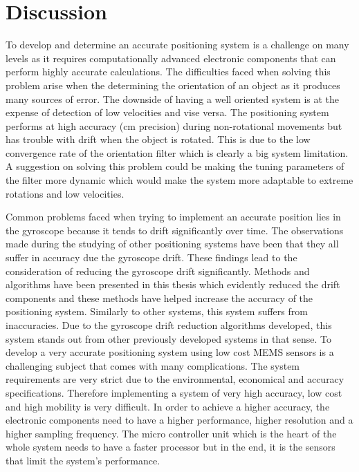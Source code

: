 \section{Discussion}
To develop and determine an accurate positioning system is a challenge on many levels as it requires computationally advanced electronic components that can perform highly accurate calculations. The difficulties faced when solving this problem arise when the determining the orientation of an object as it produces many sources of error. The downside of having a well oriented system is at the expense of detection of low velocities and vise versa. The positioning system performs at high accuracy (cm precision) during non-rotational movements but has trouble with drift when the object is rotated. This is due to the low convergence rate of the orientation filter which is clearly a big system limitation. A suggestion on solving this problem could be making the tuning parameters of the filter more dynamic which would make the system more adaptable to extreme rotations and low velocities.

Common problems faced when trying to implement an accurate position lies in the gyroscope because it tends to drift significantly over time. The observations made during the studying of other positioning systems have been that they all suffer in accuracy due the gyroscope drift. These findings lead to the consideration of reducing the gyroscope drift significantly. Methods and algorithms have been presented in this thesis which evidently reduced the drift components and these methods have helped increase the accuracy of the positioning system. Similarly to other systems, this system suffers from inaccuracies. Due to the gyroscope drift reduction algorithms developed, this system stands out from other previously developed systems in that sense. To develop a very accurate positioning system using low cost MEMS sensors is a challenging subject that comes with many complications. The system requirements are very strict due to the environmental, economical and accuracy specifications. Therefore implementing a system of very high accuracy, low cost and high mobility is very difficult. In order to achieve a higher accuracy, the electronic components need to have a higher performance, higher resolution and a higher sampling frequency. The micro controller unit which is the heart of the whole system needs to have a faster processor but in the end, it is the sensors that limit the system’s performance.